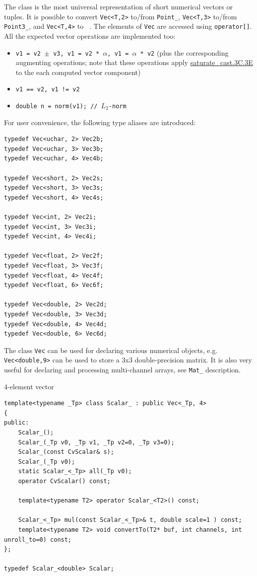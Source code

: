 The class is the most universal representation of short numerical vectors or tuples. It is possible to convert \texttt{Vec<T,2>} to/from \texttt{Point\_}, \texttt{Vec<T,3>} to/from \texttt{Point3\_}, and \texttt{Vec<T,4>} to ~. The elements of \texttt{Vec} are accessed using \texttt{operator[]}. All the expected vector operations are implemented too:

\begin{itemize}
    \item \texttt{v1 = v2 $\pm$ v3, v1 = v2 * $\alpha$, v1 = $\alpha$ * v2} (plus the corresponding augmenting operations; note that these operations apply \hyperref[saturatecast]{saturate\_cast.3C.3E} to the each computed vector component)
    \item \texttt{v1 == v2, v1 != v2}
    \item \texttt{double n = norm(v1); // $L_2$-norm}
\end{itemize}

For user convenience, the following type aliases are introduced:
\begin{lstlisting}
typedef Vec<uchar, 2> Vec2b;
typedef Vec<uchar, 3> Vec3b;
typedef Vec<uchar, 4> Vec4b;

typedef Vec<short, 2> Vec2s;
typedef Vec<short, 3> Vec3s;
typedef Vec<short, 4> Vec4s;

typedef Vec<int, 2> Vec2i;
typedef Vec<int, 3> Vec3i;
typedef Vec<int, 4> Vec4i;

typedef Vec<float, 2> Vec2f;
typedef Vec<float, 3> Vec3f;
typedef Vec<float, 4> Vec4f;
typedef Vec<float, 6> Vec6f;

typedef Vec<double, 2> Vec2d;
typedef Vec<double, 3> Vec3d;
typedef Vec<double, 4> Vec4d;
typedef Vec<double, 6> Vec6d;
\end{lstlisting}

The class \texttt{Vec} can be used for declaring various numerical objects, e.g. \texttt{Vec<double,9>} can be used to store a 3x3 double-precision matrix. It is also very useful for declaring and processing multi-channel arrays, see \texttt{Mat\_} description.

4-element vector

\begin{lstlisting}
template<typename _Tp> class Scalar_ : public Vec<_Tp, 4>
{
public:
    Scalar_();
    Scalar_(_Tp v0, _Tp v1, _Tp v2=0, _Tp v3=0);
    Scalar_(const CvScalar& s);
    Scalar_(_Tp v0);
    static Scalar_<_Tp> all(_Tp v0);
    operator CvScalar() const;

    template<typename T2> operator Scalar_<T2>() const;

    Scalar_<_Tp> mul(const Scalar_<_Tp>& t, double scale=1 ) const;
    template<typename T2> void convertTo(T2* buf, int channels, int unroll_to=0) const;
};

typedef Scalar_<double> Scalar;
\end{lstlisting}

